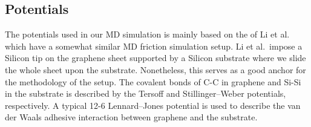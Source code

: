 







\subsection{Potentials}


The potentials used in our MD simulation is mainly based on the of Li et al.\
\cite{li_evolving_2016} which have a somewhat similar MD friction simulation
setup. Li et al.\ impose a Silicon tip on the graphene sheet supported by a
Silicon substrate where we slide the whole sheet upon the substrate.
Nonetheless, this serves as a good anchor for the methodology of the setup. The
covalent bonds of C-C in graphene and Si-Si in the substrate is described by the
Tersoff and Stillinger–Weber potentials, respectively. A typical 12-6
Lennard–Jones potential is used to describe the van der Waals adhesive
interaction between graphene and the substrate. 


